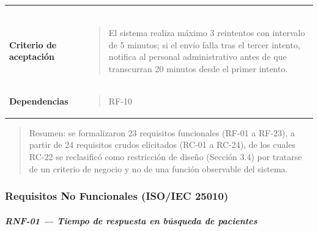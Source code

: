 \documentclass[
]{article}
\begin{document}
{\begin{longtable}[]{@{}
  >{\raggedright\arraybackslash}p{}
  >{\raggedright\arraybackslash}p{}@{}}
\begin{minipage}[t]{\linewidth}
\begin{quote}
\end{quote}
\end{minipage} \\
\textbf{Criterio de aceptación} &
\begin{minipage}[t]{\linewidth}\raggedright
\begin{quote}
El sistema realiza máximo 3 reintentos con intervalo de 5 minutos; si el
envío falla tras el tercer intento, notifica al personal administrativo
antes de que transcurran 20 minutos desde el primer intento.
\end{quote}
\end{minipage} \\
\textbf{Dependencias} & \begin{minipage}[t]{\linewidth}\raggedright
\begin{quote}
RF-10
\end{quote}
\end{minipage} \\
\end{longtable}
}

\begin{quote}
Resumen: se formalizaron 23 requisitos funcionales (RF-01 a RF-23), a
partir de 24 requisitos crudos elicitados (RC-01 a RC-24), de los cuales
RC-22 se reclasificó como restricción de diseño (Sección 3.4) por
tratarse de un criterio de negocio y no de una función observable del
sistema.
\end{quote}

\subsubsection{Requisitos No Funcionales (ISO/IEC
25010)}\label{requisitos-no-funcionales-isoiec-25010}

\subparagraph{RNF-01 --- Tiempo de respuesta en búsqueda de
pacientes}\label{rnf-01-tiempo-de-respuesta-en-busqueda-de-pacientes}
\end{document}
